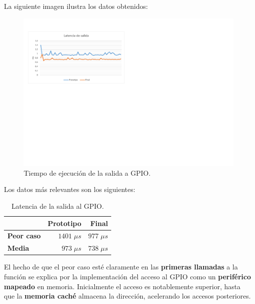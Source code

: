 La siguiente imagen ilustra los datos obtenidos:

\smallskip

\begin{figure}[H]
	\noindent \begin{centering}
		\includegraphics[width=\linewidth*3/4]{capitulo6/lat_gpio}
		\par\end{centering}
	\smallskip
	\caption{\label{fig:lat_gpio} Tiempo de ejecución de la salida a GPIO.}
\end{figure}

\smallskip

Los datos más relevantes son los siguientes:

\smallskip

\begin{table}[H]
	\begin{center}
		\begin{tabular}{|l|r|r|}
			\hline & \textbf{Prototipo} & \textbf{Final} \\ 
			\hline \textbf{Peor caso} & $1401 \; \mu s$ & $977 \; \mu s$ \\
			\hline \textbf{Media} & $973 \; \mu s$ & $738 \; \mu s$ \\
			\hline
		\end{tabular}
		\smallskip
		\caption{\label{tab:lat_gpio} Latencia de la salida al GPIO.}
	\end{center}
\end{table}

\smallskip

El hecho de que el peor caso esté claramente en las \textbf{primeras llamadas} a la función se explica por la implementación del acceso al \acrshort{GPIO} como un \textbf{periférico mapeado} en memoria. Inicialmente el acceso es notablemente superior, hasta que la \textbf{memoria caché} almacena la dirección, acelerando los accesos posteriores.

